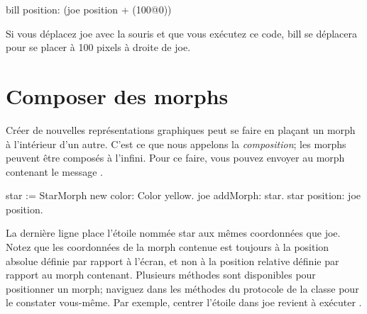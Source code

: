 \documentclass[a4paper,10pt,twoside]{book}
\begin{document}
\begin{code}{}
bill position: (joe position + (100@0))
\end{code}
\noindent

Si vous d\'eplacez joe avec la souris et que vous ex\'ecutez ce code,
bill se d\'eplacera pour se placer \`a 100 pixels \`a droite de joe.

\section{Composer des morphs}

Cr\'eer de nouvelles repr\'esentations graphiques peut se faire en
pla\c{c}ant un morph \`a l'int\'erieur d'un autre. C'est ce que nous
appelons la \emph{composition}; les morphs peuvent \^etre compos\'es
\`a l'infini. %
Pour ce faire, vous pouvez envoyer au morph contenant le message
. %
%

\begin{code}{}
star := StarMorph new color: Color yellow.
joe addMorph: star.
star position: joe position.
\end{code}

\noindent
La derni\`ere ligne place l'\'etoile nomm\'ee star aux m\^emes
coordonn\'ees que joe. Notez que les coordonn\'ees de la morph
contenue est toujours \`a la position absolue d\'efinie par rapport
\`a l'\'ecran, et non \`a la position relative d\'efinie par rapport
au morph contenant.
Plusieurs m\'ethodes sont disponibles pour positionner un morph;
naviguez dans les m\'ethodes du protocole  de la
classe  pour le constater vous-m\^eme.
Par exemple, centrer l'\'etoile dans joe revient \`a ex\'ecuter
  .
\end{document}
